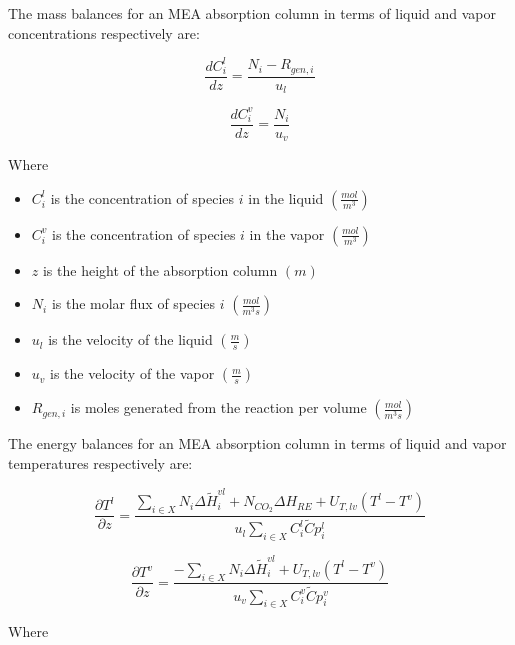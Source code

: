 The mass balances for an MEA absorption column in terms of liquid and vapor concentrations respectively are:


\begin{equation}
\frac{dC_i^l}{dz} = \frac{N_i - R_{gen,i}}{u_l}
\end{equation}

\begin{equation}
\frac{dC_i^v}{dz} = \frac{N_i}{u_v}
\end{equation}

Where

\begin{itemize}
  \item $C_i^l$ is the concentration of species $i$ in the liquid $(\frac{mol}{m^3})$
  \item $C_i^v$ is the concentration of species $i$ in the vapor $(\frac{mol}{m^3})$
  \item $z$ is the height of the absorption column $(m)$
  \item $N_i$ is the molar flux of species $i$ $(\frac{mol}{m^3 s})$
  \item $u_l$ is the velocity of the liquid $(\frac{m}{s})$
  \item $u_v$ is the velocity of the vapor $(\frac{m}{s})$
  \item $R_{gen,i}$ is moles generated from the reaction per volume $(\frac{mol}{m^3 s})$
\end{itemize}

The energy balances for an MEA absorption column in terms of liquid and vapor temperatures respectively are:



\begin{equation}
\frac{\partial T^l}{\partial z} = \frac{ \sum_{i \in X} N_i \Delta \widetilde{H}_i^{v l}+ N_{C O_2} \Delta H_{R E} + U_{T, l v}\left(T^l-T^v\right)}{u_l \sum_{i \in X} C_i^l \tilde{C} p_i^l}
\end{equation}



\begin{equation}
\frac{\partial T^v}{\partial z} = \frac{ -\sum_{i \in X} N_i \Delta \widetilde{H}_i^{v l} + U_{T, l v}\left(T^l-T^v\right)}{u_v \sum_{i \in X} C_i^v \tilde{C} p_i^v}
\end{equation}

Where

